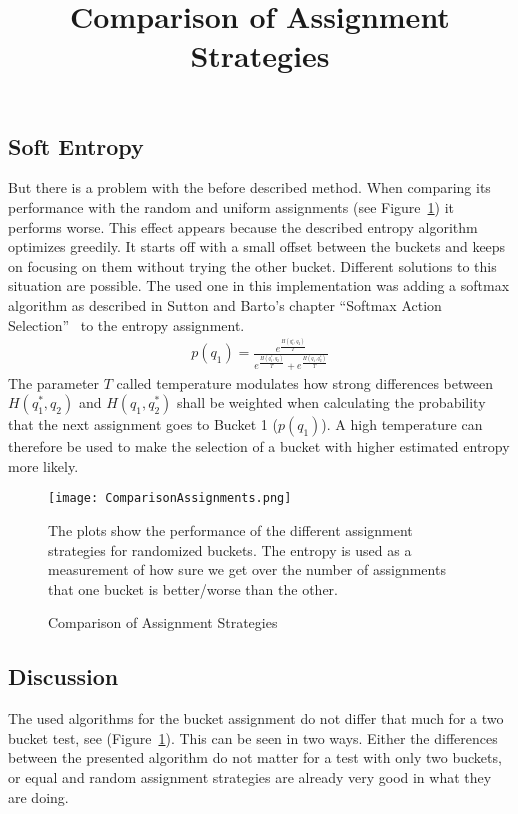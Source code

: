 \documentclass[../Thesis.tex]{subfiles}
\begin{document}
\subsection{Soft Entropy}
But there is a problem with the before described method. When comparing its performance with the random and uniform assignments (see Figure~\ref{fig:AssignmentComp}) it performs worse. This effect appears because the described entropy algorithm optimizes greedily. It starts off with a small offset between the buckets and keeps on focusing on them without trying the other bucket. Different solutions to this situation are possible. The used one in this implementation was adding a softmax algorithm as described in Sutton and Barto's chapter ``Softmax Action Selection''~\cite{sutton1998reinforcement} to the entropy assignment.
\begin{align*}
p(q_1) = \frac{e^{\frac{H(q_1^*,q_2)}{T}}}{e^{\frac{H(q_1^*,q_2)}{T}}+e^{\frac{H(q_1,q_2^*)}{T}}}
\end{align*}
The parameter $T$ called temperature modulates how strong differences between $H(q_1^*,q_2)$ and $H(q_1,q_2^*)$ shall be weighted when calculating the probability that the next assignment goes to Bucket 1 ($p(q_1)$). A high temperature can therefore be used to make the selection of a bucket with higher estimated entropy more likely.
\begin{figure}[ht]
\hfuzz=10cm
\texttt{[image: ComparisonAssignments.png]}
\centering
\title{Comparison of Assignment Strategies}
\caption{Comparison of Assignment Strategies}
The plots show the performance of the different assignment strategies for randomized buckets. The entropy is used as a measurement of how sure we get over the number of assignments that one bucket is better/worse than the other.
\label{fig:AssignmentComp}
\end{figure}
\subsection{Discussion}
The used algorithms for the bucket assignment do not differ that much for a two bucket test, see (Figure~\ref{fig:AssignmentComp}). This can be seen in two ways. Either the differences between the presented algorithm do not matter for a test with only two buckets, or equal and random assignment strategies are already very good in what they are doing.
\end{document}
